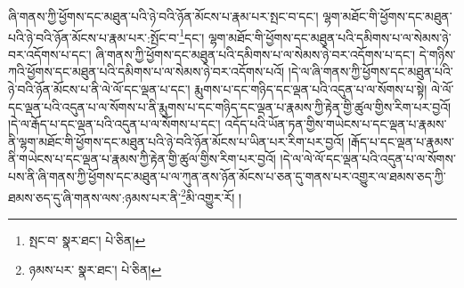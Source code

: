 ཞི་གནས་ཀྱི་ཕྱོགས་དང་མཐུན་པའི་ཉེ་བའི་ཉོན་མོངས་པ་རྣམ་པར་སྤང་བ་དང་། ལྷག་མཐོང་གི་ཕྱོགས་དང་མཐུན་པའི་ཉེ་བའི་ཉོན་མོངས་པ་རྣམ་པར་:སྤོང་བ་\footnote{སྤང་བ་  སྣར་ཐང་།  པེ་ཅིན། }དང་། ལྷག་མཐོང་གི་ཕྱོགས་དང་མཐུན་པའི་དམིགས་པ་ལ་སེམས་ཉེ་བར་འདོགས་པ་དང་། ཞི་གནས་ཀྱི་ཕྱོགས་དང་མཐུན་པའི་དམིགས་པ་ལ་སེམས་ཉེ་བར་འདོགས་པ་དང་། དེ་གཉིས་ཀའི་ཕྱོགས་དང་མཐུན་པའི་དམིགས་པ་ལ་སེམས་ཉེ་བར་འདོགས་པའོ། །དེ་ལ་ཞི་གནས་ཀྱི་ཕྱོགས་དང་མཐུན་པའི་ཉེ་བའི་ཉོན་མོངས་པ་ནི་ལེ་ལོ་དང་ལྡན་པ་དང་། རྨུགས་པ་དང་གཉིད་དང་ལྡན་པའི་འདུན་པ་ལ་སོགས་པ་སྟེ། ལེ་ལོ་དང་ལྡན་པའི་འདུན་པ་ལ་སོགས་པ་ནི་རྨུགས་པ་དང་གཉིད་དང་ལྡན་པ་རྣམས་ཀྱི་རྟེན་གྱི་ཚུལ་གྱིས་རིག་པར་བྱའོ། །དེ་ལ་རྒོད་པ་དང་ལྡན་པའི་འདུན་པ་ལ་སོགས་པ་དང་། འདོད་པའི་ཡོན་ཏན་གྱིས་གཡེངས་པ་དང་ལྡན་པ་རྣམས་ནི་ལྷག་མཐོང་གི་ཕྱོགས་དང་མཐུན་པའི་ཉེ་བའི་ཉོན་མོངས་པ་ཡིན་པར་རིག་པར་བྱའོ། །རྒོད་པ་དང་ལྡན་པ་རྣམས་ནི་གཡེངས་པ་དང་ལྡན་པ་རྣམས་ཀྱི་རྟེན་གྱི་ཚུལ་གྱིས་རིག་པར་བྱའོ། །དེ་ལ་ལེ་ལོ་དང་ལྡན་པའི་འདུན་པ་ལ་སོགས་པས་ནི་ཞི་གནས་ཀྱི་ཕྱོགས་དང་མཐུན་པ་ལ་ཀུན་ནས་ཉོན་མོངས་པ་ཅན་དུ་གནས་པར་འགྱུར་ལ་ཐམས་ཅད་ཀྱི་ཐམས་ཅད་དུ་ཞི་གནས་ལས་:ཉམས་པར་ནི་\footnote{ཉམས་པར་  སྣར་ཐང་།  པེ་ཅིན། }མི་འགྱུར་རོ། །
